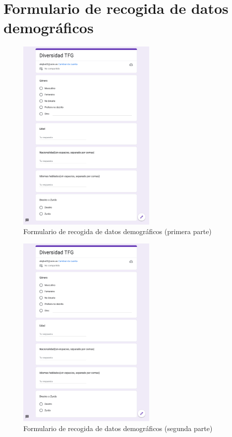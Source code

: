 \chapter{Formulario de recogida de datos demográficos}
\label{appendix:formularioDemografia}

\begin{figure}[H]
    \centering
    \includegraphics[page=1, width=0.6\textwidth]{Imagenes/Vectorial/Form_Demografia.pdf}
    \caption{Formulario de recogida de datos demográficos (primera parte)}
    \label{fig:formulario-demografia}
\end{figure}

\begin{figure}[H]
    \centering
    \includegraphics[page=2, width=0.6\textwidth]{Imagenes/Vectorial/Form_Demografia.pdf}
    \caption{Formulario de recogida de datos demográficos (segunda parte)}
    \label{fig:formulario-demografia-2}
\end{figure}